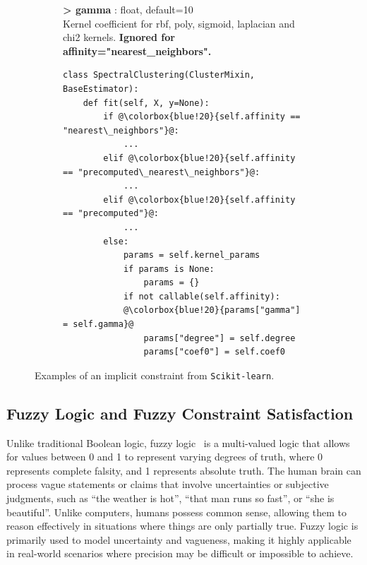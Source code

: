 \begin{figure}[t]
	\vspace{2mm}
    \begin{subfigure}{\linewidth}
        \begin{tcolorbox}[colback=Emerald!10,colframe=cyan!40!black,title=\textbf{Constraint description of \texttt{gamma} and \texttt{affinity} in class \texttt{SpectralClustering}}]
            {\sffamily \textbf{> gamma} : float, default=10
            \\
            Kernel coefficient for rbf, poly, sigmoid, laplacian and chi2 kernels. \colorbox{blue!20}{\textbf{Ignored for}} \colorbox{blue!20}{\textbf{affinity="nearest\_neighbors".}}}
        \end{tcolorbox}
        \label{fig:eg2-doc}
    \end{subfigure}
    \begin{subfigure}{\linewidth}
\begin{tcolorbox}[colback=Salmon!20, colframe=Salmon!90!Black,title=\textbf{Corresponding code snippet in class \texttt{SpectralClustering}}]
\begin{lstlisting}[escapechar=@]
class SpectralClustering(ClusterMixin, BaseEstimator):
    def fit(self, X, y=None):
        if @\colorbox{blue!20}{self.affinity == "nearest\_neighbors"}@:
            ...
        elif @\colorbox{blue!20}{self.affinity == "precomputed\_nearest\_neighbors"}@:
            ...
        elif @\colorbox{blue!20}{self.affinity == "precomputed"}@:
            ...
        else:
            params = self.kernel_params
            if params is None:
                params = {}
            if not callable(self.affinity):
            @\colorbox{blue!20}{params["gamma"] = self.gamma}@
                params["degree"] = self.degree
                params["coef0"] = self.coef0
\end{lstlisting}
\end{tcolorbox}
        \label{fig:eg2-code}
    \end{subfigure}
    \caption{Examples of an implicit constraint from \texttt{Scikit-learn}.}
    \label{fig:eg2}
    \vspace{-5pt}
\end{figure}



\subsection{Fuzzy Logic and Fuzzy Constraint Satisfaction}
Unlike traditional Boolean logic, fuzzy logic~\cite{kosko1993fuzzy} is a multi-valued logic that
allows for values between 0 and 1 to represent varying degrees of truth, where 0 represents
complete falsity, and 1 represents absolute truth.
The human brain can process vague statements or claims that involve uncertainties or subjective
judgments, such as ``the weather is hot'', ``that man runs so fast'', or ``she is beautiful''.
Unlike computers, humans possess common sense, allowing them to reason effectively in situations
where things are only partially true.
Fuzzy logic is primarily used to model uncertainty and vagueness, making it highly applicable in
real-world scenarios where precision may be difficult or impossible to achieve.

